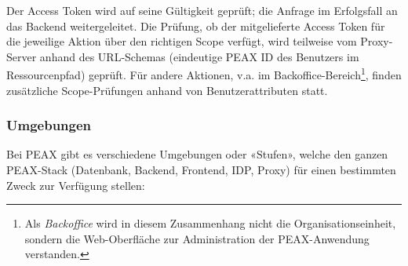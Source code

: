 Der Access Token wird auf seine Gültigkeit geprüft; die Anfrage im Erfolgsfall an das Backend weitergeleitet. Die Prüfung, ob der mitgelieferte Access Token für die jeweilige Aktion über den richtigen Scope verfügt, wird teilweise vom Proxy-Server anhand des URL-Schemas (eindeutige PEAX ID des Benutzers im Ressourcenpfad) geprüft. Für andere Aktionen, v.a. im Backoffice-Bereich\footnote{Als \textit{Backoffice} wird in diesem Zusammenhang nicht die Organisationseinheit, sondern die Web-Oberfläche zur Administration der PEAX-Anwendung verstanden.}, finden zusätzliche Scope-Prüfungen anhand von Benutzerattributen statt.

\subsubsection{Umgebungen}

Bei PEAX gibt es verschiedene Umgebungen oder «Stufen», welche den ganzen PEAX-Stack (Datenbank, Backend, Frontend, IDP, Proxy) für einen bestimmten Zweck zur Verfügung stellen:

